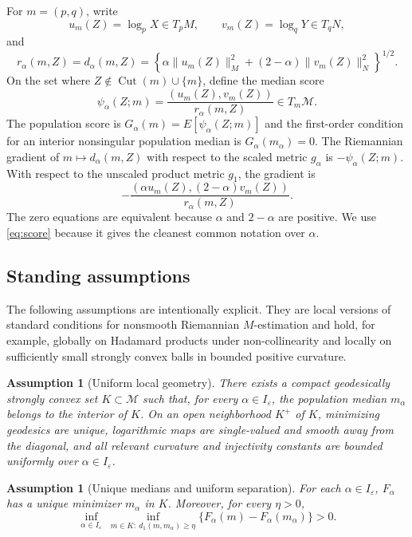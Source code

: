 \documentclass[11pt]{article}
\newtheorem{assumption}[theorem]{Assumption}
\DeclareMathOperator{\Cut}{Cut}
\newcommand{\M}{\mathcal M}
\newcommand{\eps}{\varepsilon}
\newcommand{\1}{\mathbf{1}}
\begin{document}
For $m=(p,q)$, write
\[
 u_m(Z)=\log_pX\in T_pM,
 \qquad
 v_m(Z)=\log_qY\in T_qN,
\]
and
\begin{equation}\label{eq:r-alpha}
 r_\alpha(m,Z)=d_\alpha(m,Z)
 =\left\{\alpha\|u_m(Z)\|_M^2+(2-\alpha)\|v_m(Z)\|_N^2\right\}^{1/2}.
\end{equation}
On the set where $Z\notin\Cut(m)\cup\{m\}$, define the median score
\begin{equation}\label{eq:score}
 \psi_\alpha(Z;m)
 =\frac{(u_m(Z),v_m(Z))}{r_\alpha(m,Z)}
 \in T_m\M.
\end{equation}
The population score is $ G_\alpha(m)=E[\psi_\alpha(Z;m)]$ and the first-order  condition for an interior nonsingular population median is $G_\alpha(m_\alpha)=0.$
The Riemannian gradient of $m\mapsto d_\alpha(m,Z)$ with respect to the scaled metric $g_\alpha$ is $-\psi_\alpha(Z;m)$.  With respect to the unscaled product metric $g_1$, the gradient is
\[
 -\frac{(\alpha u_m(Z),(2-\alpha)v_m(Z))}{r_\alpha(m,Z)}.
\]
The zero equations are equivalent because $\alpha$ and $2-\alpha$ are positive.  We use \eqref{eq:score} because it gives the cleanest common notation over $\alpha$.


\subsection{Standing assumptions}

The following assumptions are intentionally explicit.  They are local versions of standard conditions for nonsmooth Riemannian $M$-estimation and hold, for example, globally on Hadamard products under non-collinearity and locally on sufficiently small strongly convex balls in bounded positive curvature. 

\begin{assumption}[Uniform local geometry]\label{ass:geometry}
There exists a compact geodesically strongly convex set $K\subset\M$ such that, for every $\alpha\in I_\eps$, the population median $m_\alpha$ belongs to the interior of $K$.  On an open neighborhood $K^+$ of $K$, minimizing geodesics are unique, logarithmic maps are single-valued and smooth away from the diagonal, and all relevant curvature and injectivity constants are bounded uniformly over $\alpha\in I_\eps$.
\end{assumption}

\begin{assumption}[Unique medians and uniform separation]\label{ass:separation}
For each $\alpha\in I_\eps$, $F_\alpha$ has a unique minimizer $m_\alpha$ in $K$.  Moreover, for every $\eta>0$,
\begin{equation}\label{eq:uniform-separation}
 \inf_{\alpha\in I_\eps}\ 
 \inf_{m\in K:\ d_1(m,m_\alpha)\ge\eta}
 \{F_\alpha(m)-F_\alpha(m_\alpha)\}>0.
\end{equation}
\end{assumption}
\end{document}
